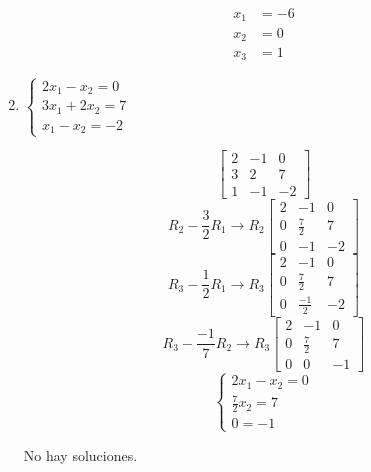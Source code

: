 \documentclass[answers]{exam} %
\begin{document}
\begin{questions}
\begin{enumerate}[label=\alph*.]
\begin{solution}
			      \[
				      \begin{aligned}
					      x_1 & = -6 \\
					      x_2 & = 0  \\
					      x_3 & = 1
				      \end{aligned}
			      \]
		      \end{solution}
			  \newpage

		\item $\displaystyle
			      \left\{
			      \begin{array}{l}
				      2x_1 - x_2 = 0  \\
				      3x_1 + 2x_2 = 7 \\
				      x_1 - x_2 = -2
			      \end{array}
			      \right.
		      $
		      \vspace{0.5cm}

		      \begin{solution}
			      \[
				      \left[
					      \begin{array}{cc|c}
						      2 & -1 & 0  \\
						      3 & 2  & 7  \\
						      1 & -1 & -2
					      \end{array}
					      \right]
			      \]
			      \[
				      R_2 - \frac{3}{2}R_1 \rightarrow R_2
				      \left[
					      \begin{array}{cc|c}
						      2 & -1          & 0  \\
						      0 & \frac{7}{2} & 7  \\
						      0 & -1          & -2
					      \end{array}
					      \right]
			      \]
			      \[
				      R_3 - \frac{1}{2}R_1 \rightarrow R_3
				      \left[
					      \begin{array}{cc|c}
						      2 & -1           & 0  \\
						      0 & \frac{7}{2}  & 7  \\
						      0 & \frac{-1}{2} & -2
					      \end{array}
					      \right]
			      \]
			      \[
				      R_3 - \frac{-1}{7}R_2 \rightarrow R_3
				      \left[
					      \begin{array}{cc|c}
						      2 & -1          & 0  \\
						      0 & \frac{7}{2} & 7  \\
						      0 & 0           & -1
					      \end{array}
					      \right]
			      \]
			      \[
				      \begin{cases}
					      2x_1 - x_2 = 0     \\
					      \frac{7}{2}x_2 = 7 \\
					      0 = -1
				      \end{cases}
			      \]

			      No hay soluciones.
		      \end{solution}
	\end{enumerate}

\end{questions}
\end{document}
